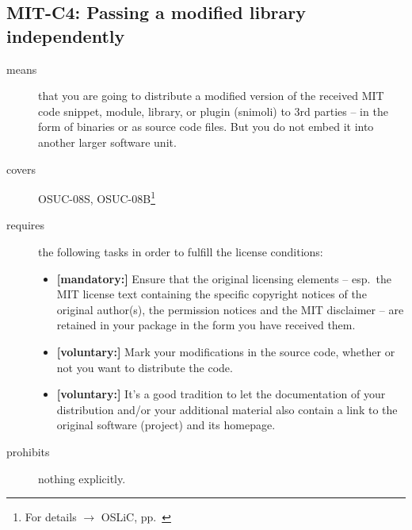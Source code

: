 \subsection{MIT-C4: Passing a modified library independently}
\label{OSUC-08S-MIT}\label{OSUC-08B-MIT}
\begin{description}
\item[means] that you are going to distribute a modified version of the received
MIT code snippet, module, library, or plugin (snimoli) to 3rd parties -- in the
form of binaries or as source code files. But you do not embed it into another
larger software unit.

\item[covers] OSUC-08S, OSUC-08B\footnote{For details $\rightarrow$ OSLiC, pp.\
\pageref{OSUC-08S-DEF}}
\item[requires] the following tasks in order to fulfill the license conditions:
\begin{itemize}
  \item \textbf{[mandatory:]} Ensure that the original licensing elements -- esp.\
  the MIT license text containing the specific copyright notices of the original
  author(s), the permission notices and the MIT disclaimer -- are retained in
  your package in the form you have received them.
  \item \textbf{[voluntary:]} Mark your modifications in the source code,
  whether or not you want to distribute the code.
  \item \textbf{[voluntary:]} It's a good tradition to let the documentation of
  your distribution and/or your additional material also contain a link to the
  original software (project) and its homepage.
\end{itemize}
\item[prohibits] nothing explicitly.
\end{description}


